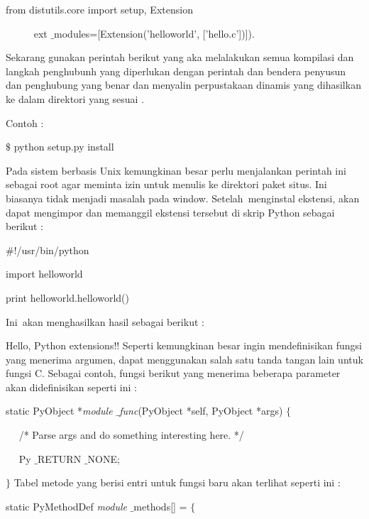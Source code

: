 from distutils.core import setup, Extension \par
~~~~~ ext $  \_  $modules=[Extension('helloworld', ['hello.c'])]). 
\vspace{12pt}

 \hspace*{0.5in} Sekarang gunakan perintah berikut yang aka melalakukan semua kompilasi dan langkah penghubunh yang diperlukan dengan perintah dan bendera penyusun dan penghubung yang benar dan menyalin perpustakaan dinamis yang dihasilkan ke dalam direktori yang sesuai . 
\vspace{12pt}
 
Contoh : 
 
 $  \$  $ python setup.py install 
\vspace{12pt}
 
 \hspace*{0.5in} Pada sistem berbasis Unix kemungkinan besar perlu menjalankan perintah ini sebagai root agar meminta izin untuk menulis ke direktori paket situs. Ini biasanya tidak menjadi masalah pada window. 
Setelah~menginstal ekstensi, akan dapat mengimpor dan memanggil ekstensi tersebut di skrip Python  sebagai berikut : 

 $  \#  $!/usr/bin/python 
 
import helloworld 
\vspace{12pt}

print helloworld.helloworld() 
\vspace{14pt}
 
Ini~akan menghasilkan hasil sebagai berikut  : 

Hello, Python extensions!! 
\vspace{12pt}
Seperti kemungkinan besar ingin mendefinisikan fungsi yang menerima argumen, dapat menggunakan salah satu tanda tangan lain untuk fungsi C. Sebagai contoh, fungsi berikut yang menerima beberapa parameter akan didefinisikan seperti ini : 

static PyObject *\textit{module $  \_  $func}(PyObject *self, PyObject *args)  $  \{  $ 

~~ /* Parse args and do something interesting here. */ 

~~ Py $  \_  $RETURN $  \_  $NONE; 

 $  \}  $ 
\vspace{12pt}
Tabel metode yang berisi entri untuk fungsi baru akan terlihat seperti ini : 

static PyMethodDef \textit{module} $  \_  $methods[] =  $  \{  $ 

